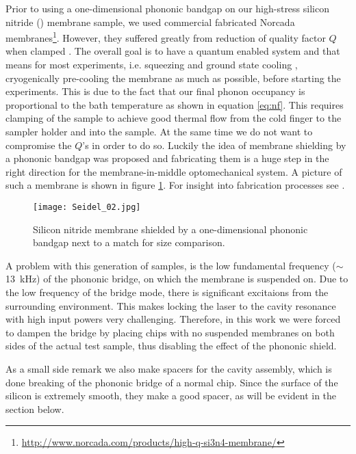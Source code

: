Prior to using a one-dimensional phononic bandgap on our high-stress silicon nitride () membrane sample, we used commercial fabricated Norcada  membranes\footnote{\url{http://www.norcada.com/products/high-q-si3n4-membrane/}}. However, they suffered greatly from reduction of quality factor $Q$ when clamped \cite{wilson2009}. The overall goal is to have a quantum enabled system and that means for most experiments, i.e. squeezing \cite{purdy2013} and ground state cooling \cite{chan2011}, cryogenically pre-cooling the membrane as much as possible, before starting the experiments. This is due to the fact that our final phonon occupancy is proportional to the bath temperature as shown in equation \eqref{eq:nf}. This requires clamping of the sample to achieve good thermal flow from the cold finger to the sampler holder and into the sample. At the same time we do not want to compromise the $Q$'s in order to do so. Luckily the idea of membrane shielding by a phononic bandgap was proposed \cite{tsaturyan2014, yu2014} and fabricating them is a huge step in the right direction for the membrane-in-middle optomechanical system. A picture of such a membrane is shown in figure \ref{fig:sample}. For insight into fabrication processes see \cite{tsaturyan2014}.

\begin{figure}[H]
\centering
\texttt{[image: Seidel\_02.jpg]}
\caption{Silicon nitride membrane shielded by a one-dimensional phononic bandgap next to a match for size comparison.}
\label{fig:sample}
\end{figure}

A problem with this generation of samples, is the low fundamental frequency ($\sim$\SI{13}{\kilo\hertz})\cite{tsaturyan2014} of the phononic bridge, on which the membrane is suspended on. Due to the low frequency of the bridge mode, there is significant excitaions from the surrounding environment. This makes locking the laser to the cavity resonance with high input powers very challenging. Therefore, in this work we were forced to dampen the bridge by placing chips with no suspended membranes on both sides of the actual test sample, thus disabling the effect of the phononic shield.

As a small side remark we also make spacers for the cavity assembly, which is done breaking of the phononic bridge of a normal chip. Since the surface of the silicon is extremely smooth, they make a good spacer, as will be evident in the section below.